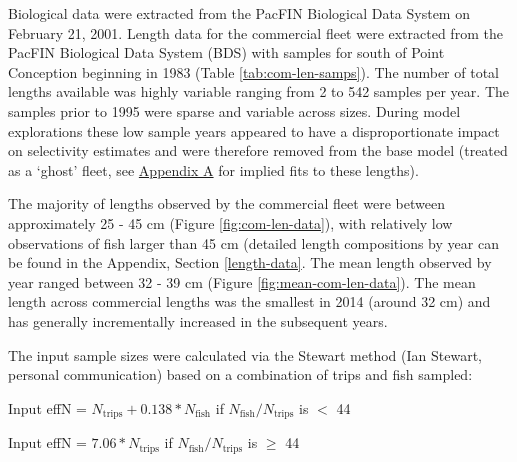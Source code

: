 \documentclass[11pt,
  english,
  a4paper,
]{article}
\begin{document}
Biological data were extracted from the PacFIN Biological Data System on February 21, 2001. Length data for the commercial fleet were extracted from the PacFIN Biological Data System (BDS) with samples for south of Point Conception beginning in 1983 (Table \ref{tab:com-len-samps}). The number of total lengths available was highly variable ranging from 2 to 542 samples per year. The samples prior to 1995 were sparse and variable across sizes. During model explorations these low sample years appeared to have a disproportionate impact on selectivity estimates and were therefore removed from the base model (treated as a `ghost' fleet, see {\protect\hyperlink{append_a}{Appendix A}\leavevmode\tagmcend\tagstructend} for implied fits to these lengths).

\leavevmode\tagmcend\tagstructend\par


The majority of lengths observed by the commercial fleet were between approximately 25 - 45 cm (Figure \ref{fig:com-len-data}), with relatively low observations of fish larger than 45 cm (detailed length compositions by year can be found in the Appendix, Section \ref{length-data}. The mean length observed by year ranged between 32 - 39 cm (Figure \ref{fig:mean-com-len-data}). The mean length across commercial lengths was the smallest in 2014 (around 32 cm) and has generally incrementally increased in the subsequent years.

\leavevmode\tagmcend\tagstructend\par


The input sample sizes were calculated via the Stewart method (Ian Stewart, personal communication) based on a combination of trips and fish sampled:

\leavevmode\tagmcend\tagstructend\par

\begin{centering}

Input effN = $N_{\text{trips}} + 0.138 * N_{\text{fish}}$ if $N_{\text{fish}}/N_{\text{trips}}$ is $<$ 44

Input effN = $7.06 * N_{\text{trips}}$ if $N_{\text{fish}}/N_{\text{trips}}$ is $\geq$ 44

\end{centering}

\end{document}

